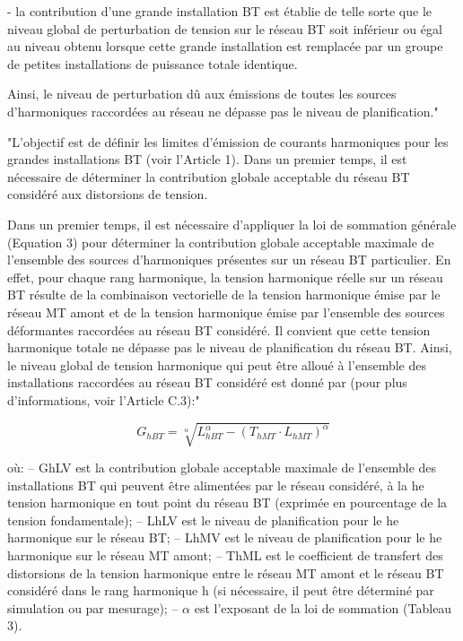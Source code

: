 - la contribution d'une grande installation BT est établie de telle sorte que le niveau global de perturbation de tension sur le réseau BT soit inférieur ou égal au niveau obtenu lorsque cette grande installation est remplacée par un groupe de petites installations de puissance totale identique.

Ainsi, le niveau de perturbation dû aux émissions de toutes les sources d'harmoniques raccordées au réseau ne dépasse pas le niveau de planification."


"L'objectif est de définir les limites d'émission de courants harmoniques pour les grandes installations BT (voir l'Article 1). Dans un premier temps, il est nécessaire de déterminer la contribution globale acceptable du réseau BT considéré aux distorsions de tension.

Dans un premier temps, il est nécessaire d'appliquer la loi de sommation générale (Equation 3) pour déterminer la contribution globale acceptable maximale de l'ensemble des sources d'harmoniques présentes sur un réseau BT particulier. En effet, pour chaque rang harmonique, la tension harmonique réelle sur un réseau BT résulte de la combinaison vectorielle de la tension harmonique émise par le réseau MT amont et de la tension harmonique émise par l'ensemble des sources déformantes raccordées au réseau BT considéré. Il convient que cette tension harmonique totale ne dépasse pas le niveau de planification du réseau BT. Ainsi, le niveau global de tension harmonique qui peut être alloué à l'ensemble des installations raccordées au réseau BT considéré est donné par (pour plus d'informations, voir l'Article C.3):"

\begin{equation}
    G_{hBT} = \sqrt[\alpha]{L_{hBT}^\alpha - (T_{hMT} \cdot L_{hMT})^\alpha}
\end{equation}

où:
– GhLV est la contribution globale acceptable maximale de l'ensemble des installations BT qui peuvent être alimentées par le réseau considéré, à la he tension harmonique en tout point du réseau BT (exprimée en pourcentage de la tension fondamentale);
– LhLV est le niveau de planification pour le he harmonique sur le réseau BT;
– LhMV est le niveau de planification pour le he harmonique sur le réseau MT amont;
– ThML est le coefficient de transfert des distorsions de la tension harmonique entre le réseau MT amont et le réseau BT considéré dans le rang harmonique h (si nécessaire, il peut être déterminé par simulation ou par mesurage);
– $\alpha$ est l'exposant de la loi de sommation (Tableau 3).

